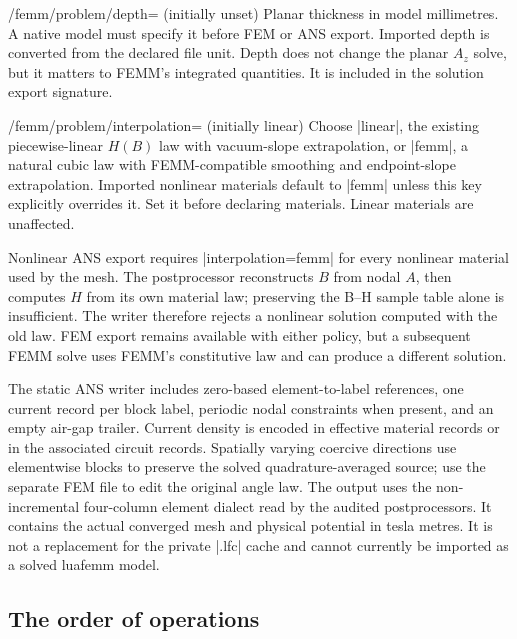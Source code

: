 \begin{key}{/femm/problem/depth= (initially unset)}
Planar thickness in model millimetres. A native model must specify it before
FEM or ANS export. Imported depth is converted from the declared file unit.
Depth does not change the planar $A_z$ solve, but it matters to FEMM's integrated
quantities. It is included in the solution export signature.
\end{key}
\begin{key}{/femm/problem/interpolation= (initially linear)}
Choose |linear|, the existing piecewise-linear $H(B)$ law with vacuum-slope
extrapolation, or |femm|, a natural cubic law with FEMM-compatible smoothing and
endpoint-slope extrapolation. Imported nonlinear materials default to |femm|
unless this key explicitly overrides it. Set it before declaring materials.
Linear materials are unaffected.
\end{key}

Nonlinear ANS export requires |interpolation=femm| for every nonlinear material
used by the mesh. The postprocessor reconstructs $B$ from nodal $A$, then computes
$H$ from its own material law; preserving the B--H sample table alone is insufficient.
The writer therefore rejects a nonlinear solution computed with the old law.
FEM export remains available with either policy, but a subsequent FEMM solve
uses FEMM's constitutive law and can produce a different solution.

The static ANS writer includes zero-based element-to-label references, one current
record per block label, periodic nodal constraints when present, and an empty
air-gap trailer. Current density is encoded in effective material records or
in the associated circuit records. Spatially varying coercive directions use
elementwise blocks to preserve the solved quadrature-averaged source; use the
separate FEM file to edit the original angle law. The output uses the
non-incremental four-column element dialect read by the audited postprocessors.
It contains the actual converged mesh and physical potential in tesla metres.
It is not a replacement for the private |.lfc| cache and cannot currently be
imported as a solved luafemm model.

\subsection{The order of operations}

